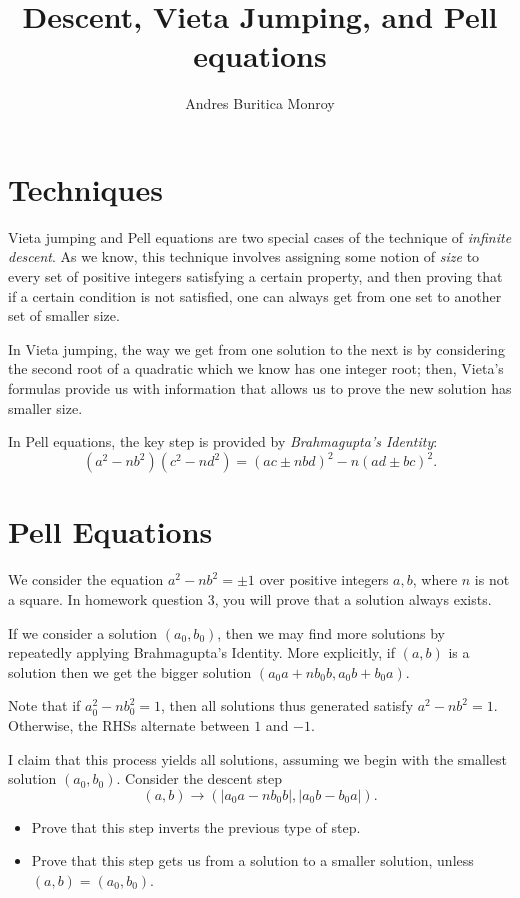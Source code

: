 \documentclass{article}
\title{Descent, Vieta Jumping, and Pell equations}
\author{Andres Buritica Monroy}
\date{}
\begin{document}
\maketitle
\section{Techniques}
Vieta jumping and Pell equations are two special cases of the technique of
\emph{infinite descent}. As we know, this technique involves assigning some
notion of \emph{size} to every set of positive integers satisfying a certain
property, and then proving that if a certain condition is not satisfied, one can
always get from one set to another set of smaller size.

In Vieta jumping, the way we get from one solution to the next is by considering
the second root of a quadratic which we know has one integer root; then, Vieta's
formulas provide us with information that allows us to prove the new solution
has smaller size.

In Pell equations, the key step is provided by \emph{Brahmagupta's
	Identity}:
\[(a^2-nb^2)(c^2-nd^2)=(ac\pm nbd)^2-n(ad\pm bc)^2.\]
\section{Pell Equations}
We consider the equation $a^2-nb^2=\pm 1$ over positive integers $a,b$, where
$n$ is not a square. In homework question 3, you will prove that a solution
always exists.

If we consider a solution $(a_0,b_0)$, then we may find more
solutions by repeatedly applying Brahmagupta's Identity. More explicitly, if
$(a,b)$ is a solution then we get the bigger solution $(a_0 a+nb_0 b,a_0 b+b_0
	a)$.

Note that if $a_0^2-nb_0^2=1$, then all solutions thus generated satisfy
$a^2-nb^2=1$. Otherwise, the RHSs alternate between $1$ and $-1$.

I claim that this process yields all solutions, assuming we begin with the
smallest solution $(a_0,b_0)$. Consider the descent step
\[(a,b)\to (|a_0 a-nb_0 b|,|a_0 b-b_0 a|).\]
\begin{itemize}
	\item Prove that this step inverts the previous type of step.
	\item Prove that this step gets us from a solution to a smaller solution,
	      unless $(a,b)=(a_0,b_0)$.
\end{itemize}
\end{document}
